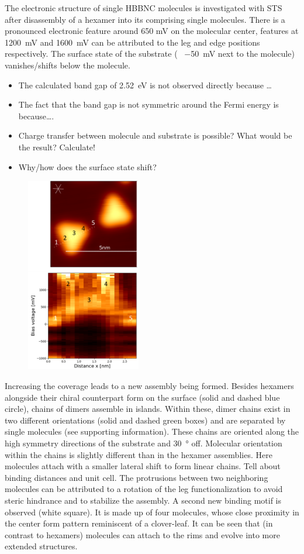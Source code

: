 The electronic structure of single HBBNC molecules is investigated with STS after disassembly of a hexamer into its comprising single molecules. There is a pronounced electronic feature around 650 mV on the molecular center, features at \SI{1200}{\milli \volt} and \SI{1600}{\milli \volt} can be attributed to the leg and edge positions respectively. The surface state of the substrate (~ \SI{-50}{\milli \volt} next to the molecule) vanishes/shifts below the molecule. 
\begin{itemize}
	\item The calculated band gap of \SI{2.52}{\eV} is not observed directly because …
	\item The fact that the band gap is not symmetric around the Fermi energy is because….
	\item Charge transfer between molecule and substrate is possible? What would be the result? Calculate!
	\item Why/how does the surface state shift?
\end{itemize}

\begin{figure}\centering
	\includegraphics[width=5cm]{./images/hbbnc-ag-111-rt-linespectrum}
	\caption{}
	\label{}
\end{figure}

Increasing the coverage leads to a new assembly being formed. Besides hexamers alongside their chiral counterpart form on the surface (solid and dashed blue circle), chains of dimers assemble in islands. Within these, dimer chains exist in two different orientations (solid and dashed green boxes) and are separated by single molecules (see supporting information). 
These chains are oriented along the high symmetry directions of the substrate and \SI{30}{\degree} off. Molecular orientation within the chains is slightly different than in the hexamer assemblies. Here molecules attach with a smaller lateral shift to form linear chains. 
Tell about
binding distances and unit cell.
The protrusions between two neighboring molecules can be attributed to a rotation of the leg functionalization to avoid steric hindrance and to stabilize the assembly.
A second new binding motif is observed (white square).  It is made up of four molecules, whose close proximity in the center form pattern reminiscent of a clover-leaf. It can be seen that (in contrast to hexamers) molecules can attach to the rims and evolve into more extended structures.


